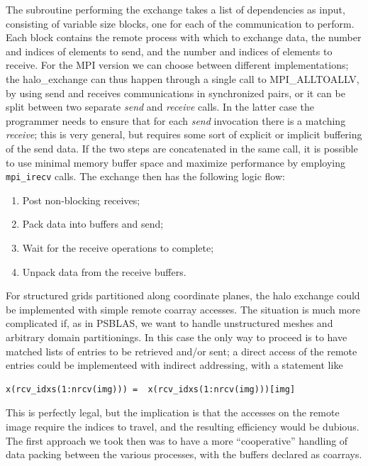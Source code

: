 \documentclass{IOS-Book-Article}
\begin{document}
The subroutine performing the exchange takes a list of dependencies as
input, consisting  of variable size blocks, one for each of the
communication to perform. Each  block contains the remote process with
which to  exchange data, the number and indices of elements to send,
and the number and indices of elements to receive.
For the MPI version we can choose between different implementations; 
the halo\_exchange can thus happen through a single call to
MPI\_ALLTOALLV, by using send and receives communications in
synchronized pairs, or it can be split between 
two separate \emph{send} and \emph{receive} calls. In the latter case
the programmer needs to ensure that for each \emph{send} invocation
there is a matching \emph{receive}; this is very general, but requires
some sort of explicit or implicit buffering of the send data. 
If the two steps are concatenated in the same call, it is possible to
use minimal memory buffer space and maximize performance by employing 
\verb|mpi_irecv| calls.
The exchange then has the following logic flow: 
\begin{enumerate}
  \item Post non-blocking receives;
  \item Pack data into buffers and send; 
  \item Wait for the receive operations to complete; 
  \item Unpack data from the receive buffers. 
\end{enumerate} 
For structured grids partitioned along coordinate planes, the halo
exchange could be implemented with simple remote coarray accesses. The
situation is much more complicated if, as in PSBLAS, we want to handle
unstructured meshes and arbitrary domain partitionings. In this  case
the only way to proceed is to have matched lists of entries to be
retrieved and/or sent; a direct access of the remote entries could be
implementeed with indirect addressing, with a statement like
\lstset{language=Fortran} 
{\small
\begin{lstlisting}
x(rcv_idxs(1:nrcv(img))) =  x(rcv_idxs(1:nrcv(img)))[img]
\end{lstlisting}}
This is perfectly legal, but the implication is that the accesses on
the remote image require the indices to travel, and the resulting
efficiency would be dubious. The first approach we took then was to 
have a more ``cooperative'' handling of data packing between the
various processes, with the buffers declared as coarrays. 
\end{document}
